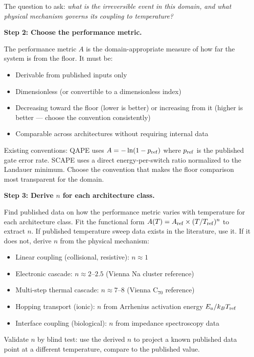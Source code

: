 \documentclass[12pt,a4paper]{article}
\begin{document}
The question to ask: \textit{what is the irreversible event in this domain,
and what physical mechanism governs its coupling to temperature?}

\textbf{Step 2: Choose the performance metric.}

The performance metric $A$ is the domain-appropriate measure of how far the
system is from the floor. It must be:
\begin{itemize}
\item Derivable from published inputs only
\item Dimensionless (or convertible to a dimensionless index)
\item Decreasing toward the floor (lower is better) or increasing from it
  (higher is better --- choose the convention consistently)
\item Comparable across architectures without requiring internal data
\end{itemize}

Existing conventions: QAPE uses $A = -\ln(1 - p_{\rm ref})$ where $p_{\rm ref}$
is the published gate error rate. SCAPE uses a direct energy-per-switch ratio
normalized to the Landauer minimum. Choose the convention that makes the floor
comparison most transparent for the domain.

\textbf{Step 3: Derive $n$ for each architecture class.}

Find published data on how the performance metric varies with temperature for
each architecture class. Fit the functional form $A(T) = A_{\rm ref} \times
(T/T_{\rm ref})^n$ to extract $n$. If published temperature sweep data exists
in the literature, use it. If it does not, derive $n$ from the physical
mechanism:
\begin{itemize}
\item Linear coupling (collisional, resistive): $n \approx 1$
\item Electronic cascade: $n \approx 2$--$2.5$ (Vienna Na cluster reference)
\item Multi-step thermal cascade: $n \approx 7$--$8$ (Vienna C$_{70}$ reference)
\item Hopping transport (ionic): $n$ from Arrhenius activation energy $E_a/k_B T_{\rm ref}$
\item Interface coupling (biological): $n$ from impedance spectroscopy data
\end{itemize}

Validate $n$ by blind test: use the derived $n$ to project a known published
data point at a different temperature, compare to the published value.
\end{document}
